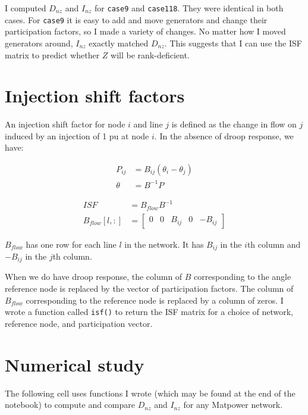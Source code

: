 \documentclass[10pt,letterpaper]{article}
\begin{document}
I computed \(D_{nz}\) and \(I_{nz}\) for \texttt{case9} and
\texttt{case118}. They were identical in both cases. For \texttt{case9}
it is easy to add and move generators and change their participation
factors, so I made a variety of changes. No matter how I moved
generators around, \(I_{nz}\) exactly matched \(D_{nz}\). This suggests
that I can use the ISF matrix to predict whether \(Z\) will be
rank-deficient.

    \section*{Injection shift factors}\label{injection-shift-factors}

An injection shift factor for node \(i\) and line \(j\) is defined as
the change in flow on \(j\) induced by an injection of 1 pu at node
\(i\). In the absence of droop response, we have:

\begin{align*}
P_{ij} &= B_{ij}(\theta_i-\theta_j) \\
\theta &= B^{-1} P
\end{align*}

\begin{align*}
ISF &= B_{flow}B^{-1} \\
B_{flow}[l,:] &= \begin{bmatrix}
0 & 0 & B_{ij} & 0 & -B_{ij} \end{bmatrix}
\end{align*}

\(B_{flow}\) has one row for each line \(l\) in the network. It has
\(B_{ij}\) in the \(i\)th column and \(-B_{ij}\) in the \(j\)th column.

When we do have droop response, the column of \(B\) corresponding to the
angle reference node is replaced by the vector of participation factors.
The column of \(B_{flow}\) corresponding to the reference node is
replaced by a column of zeros. I wrote a function called \texttt{isf()}
to return the ISF matrix for a choice of network, reference node, and
participation vector.

    \section*{Numerical study}\label{numerical-study}

The following cell uses functions I wrote (which may be found at the end
of the notebook) to compute and compare \(D_{nz}\) and \(I_{nz}\) for
any Matpower network.
\end{document}
